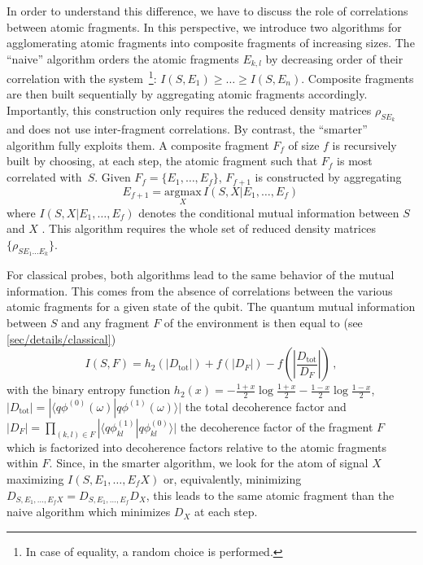 In order to understand this difference, we have to discuss the role of 
correlations between atomic fragments. In this perspective, we 
introduce two algorithms for agglomerating atomic fragments into 
composite fragments of increasing sizes.
The ``naive'' algorithm orders
the atomic fragments $E_{k,l}$ by decreasing order of their correlation with 
the system~\footnote{In case of equality, a random choice is performed.}: 
$I(S,E_1) \geq \dots \geq I(S,E_n)$. 
Composite fragments are then built sequentially by
aggregating atomic fragments accordingly.
Importantly, this construction only requires the reduced density matrices
$\rho_{SE_k}$ and does not use inter-fragment correlations.
By contrast, the ``smarter'' algorithm fully exploits them.
A composite fragment $F_f$ of size $f$ is recursively built by choosing,
at each step, the atomic fragment such that $F_f$ is most correlated
with~$S$.
Given $F_f = \lbrace E_1,\dots,E_f \rbrace$, $F_{f+1}$ is constructed by
aggregating 
%
\begin{equation}
	E_{f+1} 
=\underset{X}{\mathrm{argmax }}\, I(S,X|E_1,\dots,E_f )
\,
\end{equation}
%
where $I(S,X|E_1,\dots,E_f )$ denotes the conditional mutual
information between $S$ and $X$ \cite{Book-Wilde}. This algorithm 
requires the whole set of reduced density matrices
$\lbrace \rho_{SE_1\dots E_k} \rbrace$. 

For classical probes, both algorithms lead to the same behavior of 
the mutual information. This comes from the absence of
correlations between the various atomic fragments for a given state of
the qubit. The quantum mutual information between $S$ and any 
fragment $F$ of the environment is then equal to 
(see \cref{sec/details/classical})
%
\begin{equation}
I(S,F) =h_2(\bigr\lvert D_{\text{tot}} \bigr\rvert)+
f\left(\bigr\lvert D_F \bigr\rvert\right)-
f\left(\left\vert \frac{D_{\text{tot}}}{D_F}
\right\vert\right)\,,
\label{eq/coherentmutualinfo}
\end{equation}
with the binary entropy function
$
h_2(x) = -\frac{1+x}{2} \log\frac{1+x}{2} - \frac{1-x}{2}
	\log\frac{1-x}{2}
$, 
$\lvert D_{\text{tot}}\rvert = |\langle q\phi^{(0)}(\omega)
| q\phi^{(1)}(\omega)\rangle|$ the total decoherence factor and
$|D_F|= \prod_{(k,l) \in F}|\langle q\phi^{(1)}_{kl}
| q\phi^{(0)}_{kl}\rangle|$ the decoherence factor of the fragment
$F$ which is factorized  
into decoherence factors relative to the atomic fragments
within $F$. Since, in the smarter algorithm, 
we look for the atom of signal $X$
maximizing $I(S,E_1,\dots,E_f X)$ or, equivalently,
minimizing 
$D_{S,E_1,\dots,E_f X} = D_{S,E_1,\dots,E_f} D_X$, this
leads to the same atomic fragment than the
naive algorithm which minimizes $D_X$ at each step.

